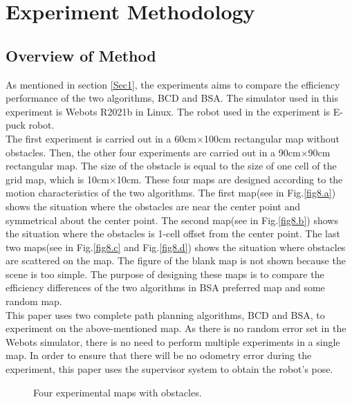 \documentclass[conference]{IEEEtran}
\begin{document}
\section{Experiment Methodology}

\subsection{Overview of Method}
As mentioned in section \ref{Sec1}, the experiments aims to compare the efficiency performance of the two algorithms, BCD and BSA. The simulator used in this experiment is Webots R2021b in Linux. The robot used in the experiment is E-puck robot\cite{Cyberboticswebsite}.\\
The first experiment is carried out in a 60cm$\times$100cm rectangular map without obstacles. Then, the other four experiments are carried out in a 90cm$\times$90cm rectangular map. The size of the obstacle is equal to the size of one cell of the grid map, which is 10cm$\times$10cm. These four maps are designed according to the motion characteristics of the two algorithms. The first map(see in Fig.\ref{fig8.a}) shows the situation where the obstacles are near the center point and symmetrical about the center point. The second map(see in Fig.\ref{fig8.b}) shows the situation where the obstacles is 1-cell offset from the center point. The last two maps(see in Fig.\ref{fig8.c} and Fig.\ref{fig8.d}) shows the situation where obstacles are scattered on the map. The figure of the blank map is not shown because the scene is too simple. The purpose of designing these maps is to compare the efficiency differences of the two algorithms in BSA preferred map and some random map.\\
This paper uses two complete path planning algorithms, BCD and BSA, to experiment on the above-mentioned map. As there is no random error set in the Webots simulator, there is no need to perform multiple experiments in a single map. In order to ensure that there will be no odometry error during the experiment, this paper uses the supervisor system to obtain the robot's pose. 

\begin{figure*}[ht]
\centering
{}\hspace{-7mm}
\quad
{}\hspace{-7mm}
\quad
{}\hspace{-7mm}
\quad
{}

\caption{Four experimental maps with obstacles.}
\label{fig8}
\end{figure*}
\end{document}
